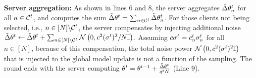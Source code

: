\textbf{Server aggregation:} As shown in lines 6 and 8, the server aggregates $\tilde{\Delta}{\theta}_n^t$ for all $n\in {\mathcal{C}}^t$, and computes the sum $\tilde{\Delta}{\theta}^t = \sum_{n\in {\mathcal{C}}^t} \tilde{\Delta}{\theta}_n^t$. For those clients not being selected, i.e., $n\in [N]\backslash {\mathcal{C}}^t$, the server compensates by injecting additional noise $\tilde{\Delta}{\theta}^t \gets \tilde{\Delta}{\theta}^t +  \sum_{n \in  [N]\backslash {\mathcal{C}}^t} {\mathcal{N}}\left(0,c^2(\sigma^t)^2/N{\mathbb{I}}\right)$. Assuming $c\sigma^t=c_n^t\sigma_n^t$ for all $n\in [N]$, because of this compensation, the total noise power ${\mathcal{N}}\left(0,c^2(\sigma^t)^2{\mathbb{I}}\right)$ that is injected to the global model update is not a function of the sampling. The round ends with the server computing ${\theta}^{t} = {\theta}^{t-1} + \frac{\tilde{\Delta}{\theta}^t}{q^tN}$ (Line 9).


